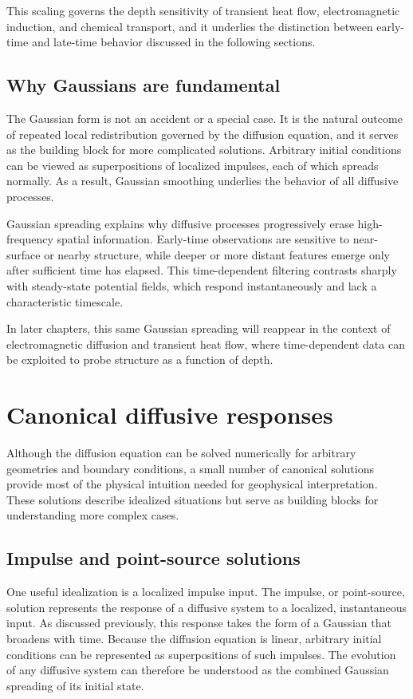 This scaling governs the depth sensitivity of transient heat flow, electromagnetic induction, and chemical transport, and it underlies the distinction between early-time and late-time behavior discussed in the following sections.

\subsection{Why Gaussians are fundamental}

The Gaussian form is not an accident or a special case. It is the natural outcome of repeated local redistribution governed by the diffusion equation, and it serves as the building block for more complicated solutions. Arbitrary initial conditions can be viewed as superpositions of localized impulses, each of which spreads normally. As a result, Gaussian smoothing underlies the behavior of all diffusive processes.

Gaussian spreading explains why diffusive processes progressively erase high-frequency spatial information. Early-time observations are sensitive to near-surface or nearby structure, while deeper or more distant features emerge only after sufficient time has elapsed. This time-dependent filtering contrasts sharply with steady-state potential fields, which respond instantaneously and lack a characteristic timescale.

In later chapters, this same Gaussian spreading will reappear in the context of electromagnetic diffusion and transient heat flow, where time-dependent data can be exploited to probe structure as a function of depth.

\section{Canonical diffusive responses}

Although the diffusion equation can be solved numerically for arbitrary geometries and boundary conditions, a small number of canonical solutions provide most of the physical intuition needed for geophysical interpretation. These solutions describe idealized situations but serve as building blocks for understanding more complex cases.

\subsection{Impulse and point-source solutions}

One useful idealization is a localized impulse input.  The impulse, or point-source, solution represents the response of a diffusive system to a localized, instantaneous input. As discussed previously, this response takes the form of a Gaussian that broadens with time. Because the diffusion equation is linear, arbitrary initial conditions can be represented as superpositions of such impulses. The evolution of any diffusive system can therefore be understood as the combined Gaussian spreading of its initial state.

